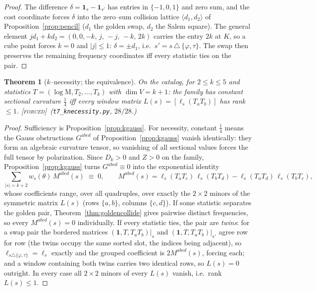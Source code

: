 \documentclass[11pt]{article}
\newtheorem{theorem}{Theorem}[section]
\theoremstyle{definition}
\newcommand{\ph}{\varphi}
\newcommand{\Mah}{\mathrm{M}}
\newcommand{\forcedtag}{{\scshape [forced]}}
\begin{document}
\begin{proof}
The difference $\delta=\mathbf 1_s-\mathbf 1_{s'}$ has entries in $\{-1,0,1\}$ and zero sum, and
the cost coordinate forces $\delta$ into the zero--sum collision lattice $\langle d_1,d_2\rangle$
of Proposition~\ref{prop:pencil} ($d_1$ the golden swap, $d_2$ the Salem square). The general element
$jd_1+kd_2=(0,0,-k,\,j,\,-j,\,-k,\,2k)$ carries the entry $2k$ at $K$, so a cube point forces
$k=0$ and $|j|\le1$: $\delta=\pm d_1$, i.e.\ $s'=s\,\triangle\,\{\ph,\tau\}$. The swap then
preserves the remaining frequency coordinates iff every statistic ties on the pair.
\end{proof}

\begin{theorem}[$k$--necessity; the equivalence]\label{thm:knec}
On the catalog, for $2\le k\le 5$ and statistics $T=(\log\Mah,T_2,\dots,T_k)$ with $\dim V=k+1$:
the family has constant sectional curvature $\tfrac14$ iff every window matrix
$L(s)=[\ell_s(T_aT_b)]$ has rank $\le1$. \forcedtag\ (\texttt{t7\_knecessity.py}, $28/28$.)
\end{theorem}

\begin{proof}
Sufficiency is Proposition~\ref{prop:kgauss}. For necessity, constant $\tfrac14$ means the Gauss
obstructions $G^{abcd}$ of Proposition~\ref{prop:kgauss} vanish identically: they form an algebraic
curvature tensor, so vanishing of all sectional values forces the full tensor by polarization.
Since $D_k>0$ and $Z>0$ on the family, Proposition~\ref{prop:kgauss} turns $G^{abcd}\equiv0$ into the
exponential identity
\[
\sum_{|s|=k+2} w_s(\theta)\,M^{abcd}(s)\;\equiv\;0,\qquad
M^{abcd}(s)=\ell_s(T_aT_c)\,\ell_s(T_bT_d)-\ell_s(T_aT_d)\,\ell_s(T_bT_c),
\]
whose coefficients range, over all quadruples, over exactly the $2\times2$ minors of the symmetric
matrix $L(s)$ (rows $\{a,b\}$, columns $\{c,d\}$). If some statistic separates the golden pair,
Theorem~\ref{thm:goldencollide} gives pairwise distinct frequencies, so every $M^{abcd}(s)=0$
individually. If every statistic ties, the pair are \emph{twins}: for a swap pair the bordered
matrices $(\mathbf 1,T,T_aT_b)|_s$ and $(\mathbf 1,T,T_aT_b)|_{s'}$ agree row for row (the twins
occupy the same sorted slot, the indices being adjacent), so
$\ell_{s\triangle\{\ph,\tau\}}=\ell_s$ exactly and the grouped coefficient is $2M^{abcd}(s)$,
forcing each; and a window containing both twins carries two identical rows, so $L(s)=0$ outright.
In every case all $2\times2$ minors of every $L(s)$ vanish, i.e.\ rank $L(s)\le1$.
\end{proof}
\end{document}
